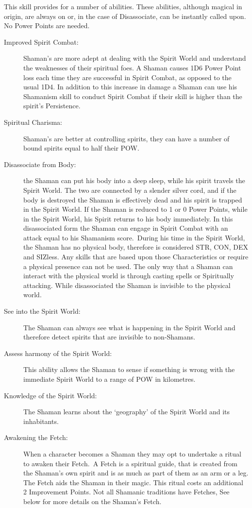This skill provides for a number of abilities. These abilities, although magical in origin, are always on or, in the case of Disassociate, can be instantly called upon. No Power Points are needed.

\begin{description}
\item[Improved Spirit Combat:] Shaman’s are more adept at dealing with the Spirit World and understand the weaknesses of their spiritual foes. A Shaman causes 1D6 Power Point loss each time they are successful in Spirit Combat, as opposed to the usual 1D4. In addition to this increase in damage a Shaman can use his Shamanism skill to conduct Spirit Combat if their skill is higher than the spirit’s Persistence.
\item[Spiritual Charisma:] Shaman’s are better at controlling spirits, they can have a number of bound spirits equal to half their POW.
\item[Disassociate from Body:] the Shaman can put his body into a deep sleep, while his spirit travels the Spirit World. The two are connected by a slender silver cord, and if the body is destroyed the Shaman is effectively dead and his spirit is trapped in the Spirit World. If the Shaman is reduced to 1 or 0 Power Points, while in the Spirit World, his Spirit returns to his body immediately. In this disassociated form the Shaman can engage in Spirit Combat with an attack equal to his Shamanism score. During his time in the Spirit World, the Shaman has no physical body, therefore is considered STR, CON, DEX and SIZless. Any skills that are based upon those Characteristics or require a physical presence can not be used. The only way that a Shaman can interact with the physical world is through casting spells or Spiritually attacking. While disassociated the Shaman is invisible to the physical world.
\item[See into the Spirit World:] The Shaman can always see what is happening in the Spirit World and therefore detect spirits that are invisible to non-Shamans.
\item[Assess harmony of the Spirit World:] This ability allows the Shaman to sense if something is wrong with the immediate Spirit World to a range of POW in kilometres. 
\item[Knowledge of the Spirit World:] The Shaman learns about the ‘geography’ of the Spirit World and its inhabitants.
\item[Awakening the Fetch:] When a character becomes a Shaman they may opt to undertake a ritual to awaken their Fetch. A Fetch is a spiritual guide, that is created from the Shaman’s own spirit and is as much as part of them as an arm or a leg. The Fetch aids the Shaman in their magic. This ritual costs an additional 2 Improvement Points. Not all Shamanic traditions have Fetches, See below for more details on the Shaman’s Fetch.  
\end{description}


